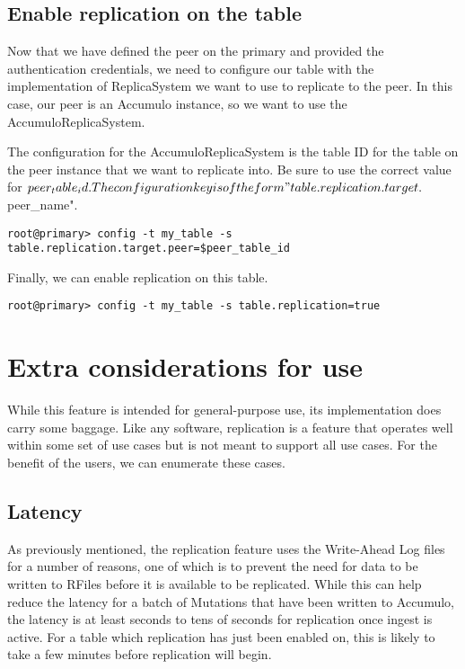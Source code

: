 \subsection{Enable replication on the table}

Now that we have defined the peer on the primary and provided the authentication credentials, we need to configure
our table with the implementation of ReplicaSystem we want to use to replicate to the peer. In this case, our peer 
is an Accumulo instance, so we want to use the AccumuloReplicaSystem.

The configuration for the AccumuloReplicaSystem is the table ID for the table on the peer instance that we
want to replicate into. Be sure to use the correct value for $peer_table_id. The configuration key is of
the form "table.replication.target.$peer_name".

\begingroup\fontsize{8pt}{8pt}\selectfont\begin{verbatim}
root@primary> config -t my_table -s table.replication.target.peer=$peer_table_id
\end{verbatim}\endgroup

Finally, we can enable replication on this table.

\begingroup\fontsize{8pt}{8pt}\selectfont\begin{verbatim}
root@primary> config -t my_table -s table.replication=true
\end{verbatim}\endgroup

\section{Extra considerations for use}

While this feature is intended for general-purpose use, its implementation does carry some baggage. Like any software,
replication is a feature that operates well within some set of use cases but is not meant to support all use cases.
For the benefit of the users, we can enumerate these cases.

\subsection{Latency}

As previously mentioned, the replication feature uses the Write-Ahead Log files for a number of reasons, one of which
is to prevent the need for data to be written to RFiles before it is available to be replicated. While this can help
reduce the latency for a batch of Mutations that have been written to Accumulo, the latency is at least seconds to tens
of seconds for replication once ingest is active. For a table which replication has just been enabled on, this is likely
to take a few minutes before replication will begin.

